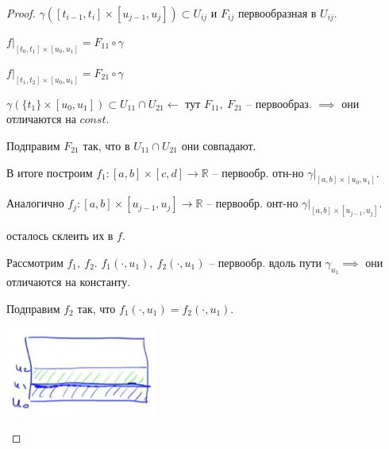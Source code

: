 \begin{proof}
    $\gamma([t_{i - 1}, t_i] \times [u_{j - 1}, u_j]) \subset U_{ij}$ и $F_{ij}$ первообразная в $U_{ij}$.

    $f|_{[t_0, t_1] \times [u_0, u_1]} = F_{11} \circ \gamma$
    
    $f|_{[t_1, t_2] \times [u_0, u_1]} = F_{21} \circ \gamma$

    $\gamma(\{ t_1 \} \times [u_0, u_1]) \subset U_{11} \cap U_{21} \leftarrow$ тут $F_{11}, \ F_{21}$ -- первообраз. $\implies$ они отличаются на $const$.

    Подправим $F_{21}$ так, что в $U_{11} \cap U_{21}$ они совпадают.

    В итоге построим $f_1: [a, b] \times [c, d] \rightarrow \mathbb{R}$ -- первообр. отн-но $\gamma|_{[a, b] \times [u_0, u_1]}$.

    Аналогично $f_j: [a, b] \times [u_{j - 1}, u_j] \rightarrow \mathbb{R}$ -- первообр. онт-но $\gamma|_{[a, b] \times [u_{j - 1}, u_j]}$.

    осталось склеить их в $f$.

    Рассмотрим $f_1, \ f_2$. $f_1(\cdot, u_1), \ f_2(\cdot, u_1)$ -- первообр. вдоль пути $\gamma_{u_1} \implies$ они отличаются на константу.

    Подправим $f_2$ так, что $f_1(\cdot, u_1) = f_2(\cdot, u_1)$.

    \begin{center}
        \includegraphics[width=5cm]{assets/03-intergrals-with-params/existance-proof-pic-2.png}
    \end{center}
\end{proof}

